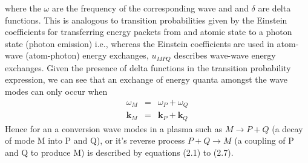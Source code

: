 where the $\omega$ are the frequency of the corresponding wave and and $\delta$ are delta functions. This is analogous to transition probabilities given by the Einstein coefficients for transferring energy packets from and atomic state to a photon state (photon emission) i.e., whereas the Einstein coefficients are used in atom-wave (atom-photon) energy exchanges, $u_{MPQ}$ describes wave-wave energy exchanges. Given the presence of delta functions in the transition probability expression, we can see that an exchange of energy quanta amongst the wave modes can only occur when 
\begin{eqnarray}
\omega_M & = & \omega_P + \omega_Q \\
\mathbf{k}_M & = & \mathbf{k}_P + \mathbf{k}_Q
\end{eqnarray}
Hence for an a conversion wave modes in a plasma such as $M \rightarrow P + Q$ (a decay of mode M into P and Q), or it's reverse process $P + Q \rightarrow M $ (a coupling of P and Q to produce M) is described by equations (2.1) to (2.7). 


